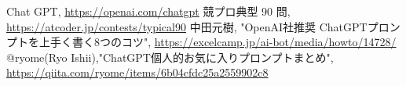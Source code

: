 \documentclass[a4j, 12pt]{jsbook}
\begin{document}
\begin{thebibliography}{9}
 Chat GPT, \url{https://openai.com/chatgpt}%
 競プロ典型 90 問, \url{https://atcoder.jp/contests/typical90}%
中田元樹, "OpenAI社推奨 ChatGPTプロンプトを上手く書く8つのコツ", \url{https://excelcamp.jp/ai-bot/media/howto/14728/}%
 @ryome(Ryo Ishii),"ChatGPT個人的お気に入りプロンプトまとめ", \url{https://qiita.com/ryome/items/6b04cfdc25a2559902c8}%



\end{thebibliography}
\end{document}
